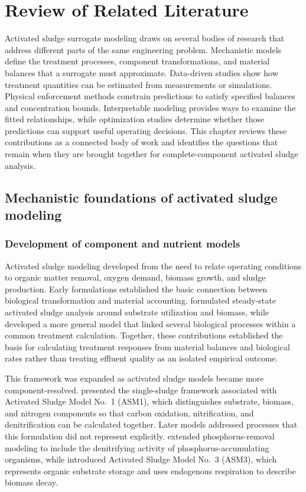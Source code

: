 \chapter{Review of Related Literature}
\label{ch:literature}

Activated sludge surrogate modeling draws on several bodies of research that address different parts of the same engineering problem. Mechanistic models define the treatment processes, component transformations, and material balances that a surrogate must approximate. Data-driven studies show how treatment quantities can be estimated from measurements or simulations. Physical enforcement methods constrain predictions to satisfy specified balances and concentration bounds. Interpretable modeling provides ways to examine the fitted relationships, while optimization studies determine whether those predictions can support useful operating decisions. This chapter reviews these contributions as a connected body of work and identifies the questions that remain when they are brought together for complete-component activated sludge analysis.

\section{Mechanistic foundations of activated sludge modeling}

\subsection{Development of component and nutrient models}

Activated sludge modeling developed from the need to relate operating conditions to organic matter removal, oxygen demand, biomass growth, and sludge production. Early formulations established the basic connection between biological transformation and material accounting. \citet{Marais1976} formulated steady-state activated sludge analysis around substrate utilization and biomass, while \citet{Dold1981} developed a more general model that linked several biological processes within a common treatment calculation. Together, these contributions established the basis for calculating treatment responses from material balances and biological rates rather than treating effluent quality as an isolated empirical outcome.

This framework was expanded as activated sludge models became more component-resolved. \citet{Henze1987} presented the single-sludge framework associated with Activated Sludge Model No.\ 1 (ASM1), which distinguishes substrate, biomass, and nitrogen components so that carbon oxidation, nitrification, and denitrification can be calculated together. Later models addressed processes that this formulation did not represent explicitly. \citet{Henze1999} extended phosphorus-removal modeling to include the denitrifying activity of phosphorus-accumulating organisms, while \citet{Gujer1999} introduced Activated Sludge Model No.\ 3 (ASM3), which represents organic substrate storage and uses endogenous respiration to describe biomass decay.


